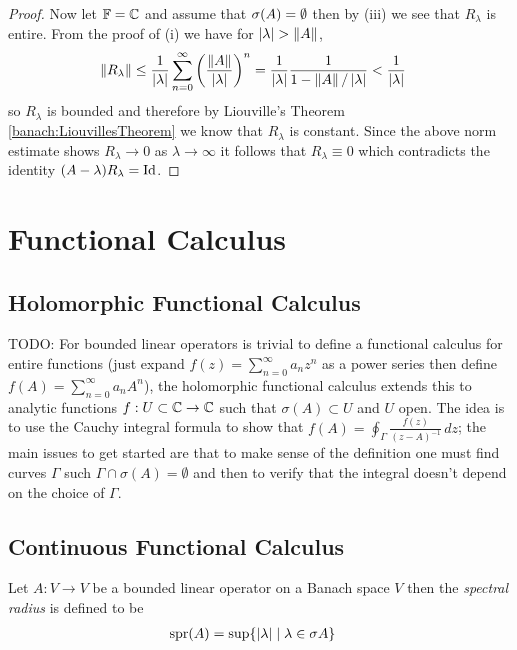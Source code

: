 \begin{proof}
Now let $\mathbb{F} = \mathbb{C}$ and assume that $\sigma(A) = \emptyset$ then by (iii) we see that $R_\lambda$ is entire.  From the proof of (i) we have for $\left \vert \lambda \right \vert > \left \lVert A \right \rVert$,
\begin{align*}
\left \lVert R_\lambda \right \rVert &\leq \frac{1}{\left \vert \lambda \right \vert} \sum_{n=0}^\infty \left( \frac{\left \lVert A \right \rVert}{\left \vert \lambda \right \vert} \right)^n = \frac{1}{\left \vert \lambda \right \vert} \frac{1}{1 - \left \lVert A \right \rVert/\left \vert \lambda \right \vert} < \frac{1}{\left \vert \lambda \right \vert} 
\end{align*}
so $R_\lambda$ is bounded and therefore by Liouville's Theorem \ref{banach:LiouvillesTheorem} we know that $R_\lambda$ is constant.  Since the above norm estimate shows $R_\lambda \to 0$ as $\lambda \to \infty$ it follows that $R_\lambda \equiv 0$ which contradicts the identity $(A - \lambda) R_\lambda = \operatorname*{Id}$.
\end{proof}

\section{Functional Calculus}

\subsection{Holomorphic Functional Calculus}

TODO: For bounded linear operators is trivial to define a functional calculus for entire functions (just expand $f(z) = \sum_{n=0}^\infty a_n z^n$ as a power series then define $f(A) = \sum_{n=0}^\infty a_n A^n$), the holomorphic functional calculus extends this to analytic functions $f : U \subset \mathbb{C} \to \mathbb{C}$ such that $\sigma(A) \subset U$ and $U$ open.  The idea is to use the Cauchy integral formula to show that $f(A) = \oint_{\Gamma} \frac{f(z)}{(z - A)^{-1}} \, dz$; the main issues to get started are that to make sense of the definition one must find curves $\Gamma$ such $\Gamma \cap \sigma(A) = \emptyset$ and then to verify that the integral doesn't depend on the choice of $\Gamma$.

\subsection{Continuous Functional Calculus}

\begin{defn}Let $A : V \to V$ be a bounded linear operator on a Banach space $V$ then the \emph{spectral radius} is defined to be 
\begin{align*}
\operatorname*{spr}(A) &= \sup \lbrace \left \vert \lambda \right \vert \mid \lambda \in \sigma{A} \rbrace
\end{align*}
\end{defn}

